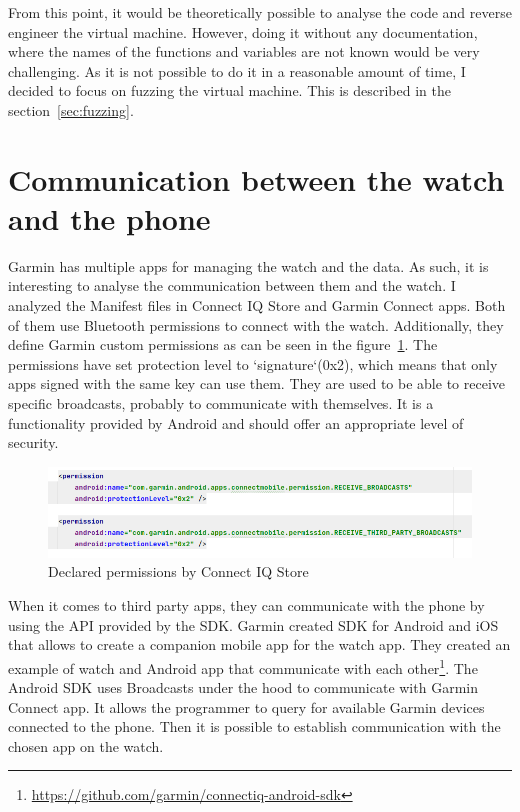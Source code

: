 From this point, it would be theoretically possible to analyse the code and reverse engineer the virtual machine.
However, doing it without any documentation, where the names of the functions and variables are not known would be very challenging.
As it is not possible to do it in a reasonable amount of time, I decided to focus on fuzzing the virtual machine.
This is described in the section~\ref{sec:fuzzing}.

\section{Communication between the watch and the phone} \label{subsec:communication-watch-phone}

Garmin has multiple apps for managing the watch and the data.
As such, it is interesting to analyse the communication between them and the watch.
I analyzed the Manifest files in Connect IQ Store and Garmin Connect apps.
Both of them use Bluetooth permissions to connect with the watch.
Additionally, they define Garmin custom permissions as can be seen in the figure~\ref{fig:connect-iq-store-permissions}.
The permissions have set protection level to `signature`(0x2), which means that only apps signed with the same key can use them.
They are used to be able to receive specific broadcasts, probably to communicate with themselves.
It is a functionality provided by Android and should offer an appropriate level of security.

\begin{figure}[h]
    \centering
    \includegraphics[width=1\linewidth]{../../images/android-declared-permissions}
    \caption{Declared permissions by Connect IQ Store}
    \label{fig:connect-iq-store-permissions}
\end{figure}

When it comes to third party apps, they can communicate with the phone by using the API provided by the SDK\@.
Garmin created SDK for Android and iOS that allows to create a companion mobile app for the watch app.
They created an example of watch and Android app that communicate with each other\footnote{\url{https://github.com/garmin/connectiq-android-sdk}}.
The Android SDK uses Broadcasts under the hood to communicate with Garmin Connect app.
It allows the programmer to query for available Garmin devices connected to the phone.
Then it is possible to establish communication with the chosen app on the watch.

